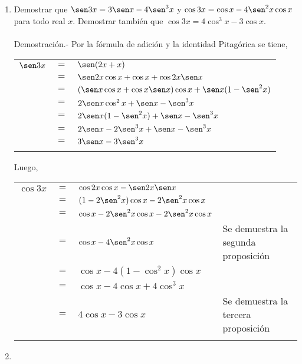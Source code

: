 \begin{enumerate}
\item Demostrar que $\sen 3x = 3\sen x-4\sen^3 x $ y $\cos 3x = \cos x -4\sen^2 x \cos x$ para todo real $x$. Demostrar también que $\cos 3x=4\cos^3 x -3\cos x$.\\\\
	Demostración.-\; Por la fórmula de adición y la identidad Pitagórica se tiene,
	\begin{center}
	    \begin{tabular}{rcl}
		$\sen3x$&$=$&$\sen(2x+x)$\\
		&$=$&$\sen2x \cos x + \cos x + \cos 2x \sen x$\\
		&$=$&$(\sen x \cos x + \cos x \sen x)\cos x + \sen x(1-\sen^2x)$\\
		&$=$&$2\sen x \cos^2 x +\sen x - \sen^3 x$\\
		&$=$&$2\sen x(1-\sen^2 x)+\sen x -\sen^3 x$\\
		&$=$&$2\sen x - 2\sen^3 x + \sen x - \sen^3 x$\\
		&$=$&$3\sen x - 3 \sen^3 x$\\\\
	    \end{tabular}
	\end{center}
	 Luego,
	\begin{center}
	    \begin{tabular}{rcll}
		$\cos 3x$&$=$&$\cos 2x \cos x - \sen 2x \sen x$&\\
		&$=$&$(1-2\sen^2 x)\cos x - 2\sen^2 x \cos x$&\\
		&$=$&$\cos x - 2\sen^2 x \cos x - 2\sen^2 x \cos x$&\\
		&$=$&$\cos x - 4\sen^2 x \cos x$&Se demuestra la segunda proposición\\
		&$=$&$\cos x - 4(1-\cos^2x)\cos x$&\\
		&$=$&$\cos x - 4\cos x +4\cos^3 x$&\\
		&$=$&$4\cos x - 3 \cos x$&Se demuestra la tercera proposición\\\\
	    \end{tabular}
	\end{center}

\item 
\begin{enumerate}[\bfseries (a)]


\end{enumerate}
\end{enumerate}
